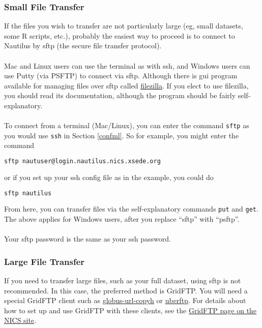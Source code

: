 \subsubsection{Small File Transfer}
If the files you wish to transfer are not particularly large (eg, small datasets, some R scripts, etc.), probably the easiest way to proceed is to connect to Nautilus by sftp (the secure file transfer protocol).  \\\\
%
Mac and Linux users can use the terminal as with ssh, and Windows users can use Putty (via PSFTP) to connect via sftp.  Although there is gui program available for managing files over sftp called \href{http://filezilla-project.org/}{filezilla}.  If you elect to use filezilla, you should read its documentation, although the program should be fairly self-explanatory.\\\\
%
To connect from a terminal (Mac/Linux), you can enter the command \texttt{sftp} as you would use \texttt{ssh} in Section \ref{confml}.  So for example, you might enter the command
\begin{lstlisting}[language=sh]
sftp nautuser@login.nautilus.nics.xsede.org
\end{lstlisting}%
or if you set up your ssh config file as in the example, you could do
\begin{lstlisting}[language=sh]
sftp nautilus
\end{lstlisting}%
From here, you can transfer files via the self-explanatory commands \texttt{put} and \texttt{get}.  The above applies for Windows users, after you replace ``sftp'' with ``psftp''.\\\\
%
Your sftp password is the same as your ssh password. 

\subsubsection{Large File Transfer}
If you need to transfer large files, such as your full dataset, using sftp is not recommended.  In this case, the preferred method is GridFTP.  You will need a special GridFTP client such as \href{https://www.globusonline.org/}{globus-url-copyh} or \href{http://dims.ncsa.illinois.edu/set/uberftp/}{uberftp}.  For details about how to set up and use GridFTP with these clients, see the \href{http://www.nics.tennessee.edu/user-support/general-support/data-transfer/gridftp}{GridFTP page on the NICS site}.
